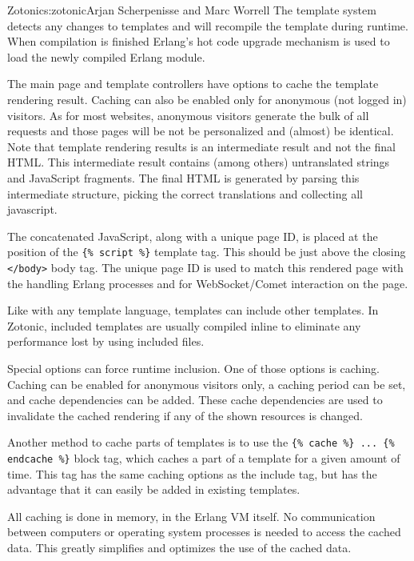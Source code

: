 \begin{aosachapter}{Zotonic}{s:zotonic}{Arjan Scherpenisse and Marc Worrell}
The template system detects any changes to templates and will recompile
the template during runtime. When compilation is finished Erlang's hot
code upgrade mechanism is used to load the newly compiled Erlang module.

The main page and template controllers have options to cache the
template rendering result. Caching can also be enabled only for
anonymous (not logged in) visitors. As for most websites, anonymous
visitors generate the bulk of all requests and those pages will be not
be personalized and (almost) be identical. Note that template rendering
results is an intermediate result and not the final HTML. This
intermediate result contains (among others) untranslated strings and
JavaScript fragments. The final HTML is generated by parsing this
intermediate structure, picking the correct translations and collecting
all javascript.

The concatenated JavaScript, along with a unique page ID, is placed at
the position of the \linebreak \texttt{\{\% script \%\}} template tag.
This should be just above the closing
\texttt{\textless{}/body\textgreater{}} body tag. The unique page ID is
used to match this rendered page with the handling Erlang processes and
for WebSocket/Comet interaction on the page.

Like with any template language, templates can include other templates.
In Zotonic, included templates are usually compiled inline to eliminate
any performance lost by using included files.

Special options can force runtime inclusion. One of those options is
caching. Caching can be enabled for anonymous visitors only, a caching
period can be set, and cache dependencies can be added. These cache
dependencies are used to invalidate the cached rendering if any of the
shown resources is changed.

Another method to cache parts of templates is to use the
\texttt{\{\% cache \%\} ... \{\% endcache \%\}} block tag, which caches
a part of a template for a given amount of time. This tag has the same
caching options as the include tag, but has the advantage that it can
easily be added in existing templates.


All caching is done in memory, in the Erlang VM itself. No communication
between computers or operating system processes is needed to access the
cached data. This greatly simplifies and optimizes the use of the cached
data.


\end{aosachapter}
